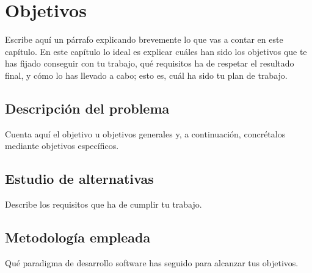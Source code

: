 \chapter{Objetivos}
\label{cap:capitulo2}


Escribe aquí un párrafo explicando brevemente lo que vas a contar en este capítulo. En este capítulo lo ideal es explicar cuáles han sido los objetivos que te has fijado conseguir con tu trabajo, qué requisitos ha de respetar el resultado final, y cómo lo has llevado a cabo; esto es, cuál ha sido tu plan de trabajo.\\

\section{Descripción del problema}
\label{sec:descripcion}

Cuenta aquí el objetivo u objetivos generales y, a continuación, concrétalos mediante objetivos específicos.

\section{Estudio de alternativas}
\label{sec:requisitos}

Describe los requisitos que ha de cumplir tu trabajo.

\section{Metodología empleada}
\label{sec:metodologia}

Qué paradigma de desarrollo software has seguido para alcanzar tus objetivos.
